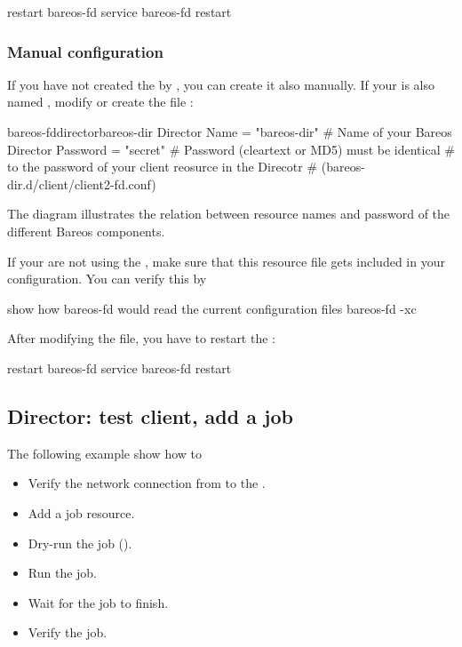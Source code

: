 \begin{commands}{restart bareos-fd}
service bareos-fd restart
\end{commands}

\subsubsection*{Manual configuration}

If you have not created the  by , you can create it also manually.
If your \bareosDir is also named , modify or create the file :

\begin{bareosConfigResource}{bareos-fd}{director}{bareos-dir}
Director {
  Name = "bareos-dir"   # Name of your Bareos Director
  Password = "secret"   # Password (cleartext or MD5) must be identical
                        # to the password of your client reosurce in the Direcotr
                        # (bareos-dir.d/client/client2-fd.conf)
}
\end{bareosConfigResource}

The diagram  illustrates the relation between resource names and password of the different Bareos components.

If your are not using the ,
make sure that this resource file gets included in your \bareosFd configuration.
You can verify this by
\begin{commands}{show how bareos-fd would read the current configuration files}
bareos-fd -xc
\end{commands}

After modifying the file, you have to restart the \bareosFd:
\begin{commands}{restart bareos-fd}
service bareos-fd restart
\end{commands}



\subsection*{Director: test client, add a job}

The following example show how to
\begin{itemize}
    \item Verify the network connection from \bareosDir to the \bareosFd.
    \item Add a job resource.
    \item Dry-run the job ().
    \item Run the job.
    \item Wait for the job to finish.
    \item Verify the job.
\end{itemize}

